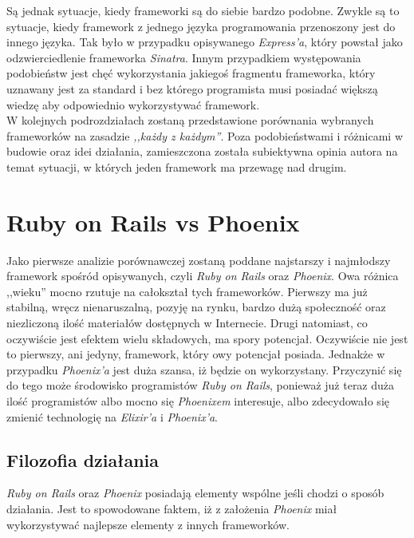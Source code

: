 \documentclass[mgr,oneside]{mgr}
\begin{document}
Są jednak sytuacje, kiedy frameworki są do siebie bardzo podobne. Zwykle są to sytuacje, kiedy framework z jednego języka programowania przenoszony jest do innego języka. Tak było w przypadku opisywanego \textit{Express'a}, który powstał jako odzwierciedlenie frameworka \textit{Sinatra}. Innym przypadkiem występowania podobieństw jest chęć wykorzystania jakiegoś fragmentu frameworka, który uznawany jest za standard i bez którego programista musi posiadać większą wiedzę aby odpowiednio wykorzystywać framework.\\

W kolejnych podrozdziałach zostaną przedstawione porównania wybranych frameworków na zasadzie \textit{,,każdy z każdym''}. Poza podobieństwami i różnicami w budowie oraz idei działania, zamieszczona została subiektywna opinia autora na temat sytuacji, w których jeden framework ma przewagę nad drugim.

\section{Ruby on Rails vs Phoenix}
Jako pierwsze analizie porównawczej zostaną poddane najstarszy i najmłodszy framework spośród opisywanych, czyli \textit{Ruby on Rails} oraz \textit{Phoenix}. Owa różnica ,,wieku'' mocno rzutuje na całokształ tych frameworków.  Pierwszy ma już stabilną, wręcz nienaruszalną, pozyję na rynku, bardzo dużą społeczność oraz niezliczoną ilość materiałów dostępnych w Internecie.
Drugi natomiast, co oczywiście jest efektem wielu składowych, ma spory potencjał. Oczywiście nie jest to pierwszy, ani jedyny, framework, który owy potencjał posiada. Jednakże w przypadku \textit{Phoenix'a} jest duża szansa, iż będzie on wykorzystany. Przyczynić się do tego może środowisko programistów \textit{Ruby on Rails}, ponieważ już teraz duża ilość programistów albo mocno się \textit{Phoenixem} interesuje, albo zdecydowało się zmienić technologię na \textit{Elixir'a} i \textit{Phoenix'a}.


\subsection{Filozofia działania}
\textit{Ruby on Rails} oraz \textit{Phoenix} posiadają elementy wspólne jeśli chodzi o sposób działania. Jest to spowodowane faktem, iż z założenia \textit{Phoenix} miał wykorzystywać najlepsze elementy z innych frameworków.
\end{document}

